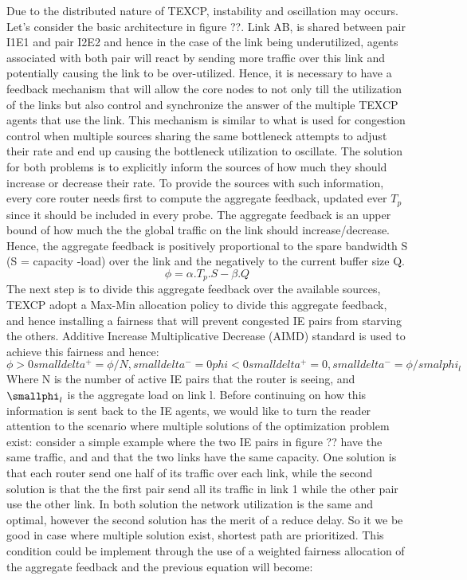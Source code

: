 Due to the distributed nature of TEXCP, instability and oscillation may occurs. Let's consider the basic architecture in figure ??.  Link AB, is shared between pair I1E1 and pair I2E2 and hence in the case of the link being underutilized, agents associated with both pair will react by sending more traffic over this link and potentially causing the link to be over-utilized. Hence, it is necessary to have a feedback mechanism that will allow the core nodes to not only till  the utilization of the links but also control and synchronize the answer of the multiple TEXCP agents that use the link. This mechanism is similar to what is used for congestion control when multiple sources sharing the same bottleneck attempts to adjust their rate and end up causing the bottleneck utilization to oscillate. The solution for both problems is to explicitly inform the sources of how much they should increase or decrease their rate. To provide the sources with such information, every core router needs first to compute the aggregate feedback, updated ever $T_p$ since it should be included in every probe. The aggregate feedback is an upper bound of how much the the global traffic on the link should increase/decrease. Hence, the aggregate feedback is positively proportional to the spare bandwidth S (S = capacity -load) over the link and the negatively to the current buffer size Q.
\begin {equation}
\phi = \alpha . T_p . S - \beta . Q
\end {equation}
The next step is to divide this aggregate feedback over the available sources, TEXCP adopt a Max-Min allocation policy to divide this aggregate feedback, and hence installing a fairness that will prevent congested IE pairs from starving the others. Additive Increase Multiplicative Decrease (AIMD) standard is used to achieve this fairness and hence: 
\begin {equation}
\phi > 0 small delta^+ = \phi/N, small delta^- = 0 
phi < 0 small delta^+ =0 , small delta^-= \phi/smalphi_l
\end {equation}
Where N is the number of active IE pairs that the router is seeing, and $\smallphi_l$ is the aggregate load on link l.
Before continuing on how this information is sent back to the IE agents, we would like to turn the reader attention to the scenario where multiple solutions of the optimization problem exist: consider a simple example where the two IE pairs in figure ?? have the same traffic, and and that the two links have the same capacity. One solution is that each router send one half of its traffic over each link, while the second solution is that the the first pair send all its traffic in link 1 while the other pair use the other link. In both solution the network utilization is the same and optimal, however the second solution has the merit of  a reduce delay. So it we be good in case where multiple solution exist, shortest path are prioritized. This condition could be implement through the use of a weighted fairness allocation of the aggregate feedback and the previous equation will become: 
